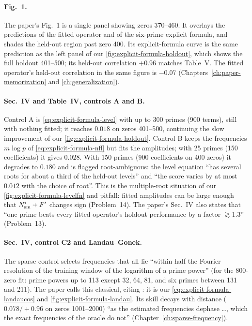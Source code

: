 \paragraph{Fig.~1.} The paper's Fig.~1 is a single panel showing zeros 370--460. It overlays the predictions of the fitted operator and of the six-prime explicit formula, and shades the held-out region past zero 400. Its explicit-formula curve is the same prediction as the left panel of our \cref{fig:explicit-formula-holdout}, which shows the full holdout 401--500; its held-out correlation $+0.96$ matches Table~V. The fitted operator's held-out correlation in the same figure is $-0.07$ (Chapters~\ref{ch:paper-memorization} and \ref{ch:generalization}).

\paragraph{Sec.~IV and Table~IV, controls A and B.} Control A is \cref{eq:explicit-formula-level} with up to 300 primes (900 terms), still with nothing fitted; it reaches $0.018$ on zeros 401--500, continuing the slow improvement of our \cref{fig:explicit-formula-holdout}. Control B keeps the frequencies $m\log p$ of \cref{eq:explicit-formula-nfl} but fits the amplitudes; with 25 primes (150 coefficients) it gives $0.028$. With 150 primes (900 coefficients on 400 zeros) it degrades to $0.180$ and is flagged root-ambiguous: the level equation ``has several roots for about a third of the held-out levels'' and ``the score varies by at most $0.012$ with the choice of root''. This is the multiple-root situation of our \cref{fig:explicit-formula-levelfn} and pitfall: fitted amplitudes can be large enough that $N_{\mathrm{sm}}'+F'$ changes sign (Problem~14). The paper's Sec.~IV also states that ``one prime beats every fitted operator's holdout performance by a factor $\gtrsim1.3$'' (Problem~13).

\paragraph{Sec.~IV, control C2 and Landau--Gonek.} The sparse control selects frequencies that all lie ``within half the Fourier resolution of the training window of the logarithm of a prime power'' (for the 800-zero fit: prime powers up to 113 except 32, 64, 81, and six primes between 131 and 211). The paper calls this classical, citing \cite{landau,gonek}: it is our \cref{eq:explicit-formula-landaucos} and \cref{fig:explicit-formula-landau}. Its skill decays with distance ($0.078/+0.96$ on zeros 1001--2000) ``as the estimated frequencies dephase \dots, which the exact frequencies of the oracle do not'' (Chapter~\ref{ch:sparse-frequency}).

